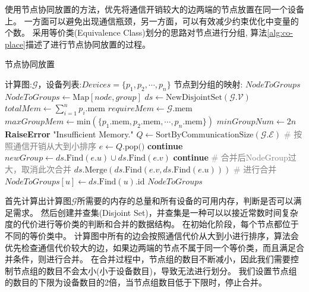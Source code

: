 \sys{} 使用节点协同放置的方法，优先将通信开销较大的边两端的节点放置在同一个设备上。
一方面可以避免出现通信瓶颈，另一方面，可以有效减少约束优化中变量的个数。
\sys{}采用等价类(Equivalence Class)划分的思路对节点进行分组,
算法\ref{alg:co-place}描述了\sys{}进行节点协同放置的过程。

\begin{algorithm}[h]
	\caption{节点协同放置}
	\label{alg:co-place}
	\begin{algorithmic}[1]
	\REQUIRE 计算图:$\mathcal{G}$，设备列表:$\mathit{Devices}=\{p_1, p_2,\cdots, p_n\}$
	\ENSURE 节点到分组的映射: $\mathit{NodeToGroups}$
	\STATE $\mathit{NodeToGroups} \leftarrow \mathrm{Map}[\mathit{node}, \mathit{group}]$
	\STATE $\mathit{ds} \leftarrow \mathrm{NewDisjointSet}(\mathcal{G}.\mathcal{V})$
	\STATE $\mathit{totalMem}\leftarrow \sum_{i=1}^{n}p_i.\text{mem}$
	\STATE $\mathit{requireMem}\leftarrow \mathcal{G}.\text{mem}$
	\STATE $\mathit{maxGroupMem}\leftarrow \text{min}(\{p_1.\text{mem}, p_2.\text{mem}, \cdots, p_n.\text{mem}\})$
	\STATE $\mathit{minGroupNum}\leftarrow 2n$
		\STATE \textbf{RaiseError} "Insufficient Memory."
	\ENDIF
	\STATE $Q\leftarrow \text{SortByCommunicationSize}(\mathcal{G}.\mathcal{E})$ \quad\textcolor{gray}{\# 按照通信开销从大到小排序}
		\STATE $e\leftarrow Q.\text{pop()}$
			\STATE \textbf{continue}
		\ELSE
			\STATE $\mathit{newGroup} \leftarrow \mathit{ds}.\text{Find}(e.u) \cup \mathit{ds}.\text{Find}(e.v)$
				\STATE \textbf{continue} \quad \textcolor{gray}{\# 合并后NodeGroup过大，取消此次合并}
			\ELSE
				\STATE $\mathit{ds}.\text{Merge}(\mathit{ds}.\text{Find}(e.v, \mathit{ds}.\text{Find}(e.u)))$ \quad \textcolor{gray}{\# 进行合并}
			\ENDIF
		\ENDIF 
	\ENDFOR
		\STATE $\mathit{NodeToGroups}[u]\leftarrow \mathit{ds}.\text{Find}(u).\text{id}$
	\ENDFOR 
	\RETURN $\mathit{NodeToGroups}$
	\end{algorithmic}
\end{algorithm}


首先计算出计算图$\mathcal{G}$所需要的内存的总量和所有设备的可用内存，判断是否可以满足需求。
然后创建并查集(Disjoint Set)，并查集是一种可以以接近常数时间复杂度的代价进行等价类的判断和合并的数据结构。
在初始化阶段，每个节点都位于不同的等价类中。
计算图中所有的边会按照通信代价从大到小进行排序，算法会优先检查通信代价较大的边，如果边两端的节点不属于同一个等价类，而且满足合并条件，则进行合并。
在合并过程中，节点组的数目不断减小，因此我们需要控制节点组的数目不会太小(小于设备数目)，导致无法进行划分。
我们设置节点组的数目的下限为设备数目的2倍，当节点组数目低于下限时，停止合并。

